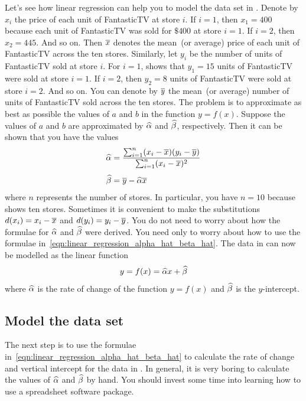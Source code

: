 \documentclass[a4paper,oneside,12pt]{article}
\begin{document}
Let's see how linear regression can help you to model the data set in
.  Denote by $x_i$ the price of each unit of
FantasticTV at store $i$.  If $i = 1$, then $x_1 = 400$ because each
unit of FantasticTV was sold for $\$400$ at store $i = 1$.  If
$i = 2$, then $x_2 = 445$.  And so on.  Then $\overline{x}$ denotes the
mean~(or average) price of each unit of FantasticTV across the ten
stores.  Similarly, let $y_i$ be the number of units of FantasticTV
sold at store $i$.  For $i = 1$,  shows that $y_1 =
15$ units of FantasticTV were sold at store $i = 1$.  If $i = 2$, then
$y_2 = 8$ units of FantasticTV were sold at store $i = 2$.  And so
on.  You can denote by $\overline{y}$ the mean~(or average) number of units
of FantasticTV sold across the ten stores.  The problem is to
approximate as best as possible the values of $a$ and $b$ in the
function $y = f(x)$.  Suppose the values of $a$ and $b$ are
approximated by $\widehat{\alpha}$ and $\widehat{\beta}$, respectively.  Then it can
be shown that you have the values
\begin{equation}
\label{eqn:linear_regression_alpha_hat_beta_hat}
\begin{aligned}
\widehat{\alpha}
&=
\frac{
  \sum_{i=1}^n (x_i - \overline{x}) (y_i - \overline{y})
}{
  \sum_{i=1}^n (x_i - \overline{x})^2
} \\[4pt]
\widehat{\beta}
&=
\overline{y} - \widehat{\alpha} \overline{x}
\end{aligned}
\end{equation}
where $n$ represents the number of stores.  In particular, you have
$n = 10$ because  shows ten stores.  Sometimes it
is convenient to make the substitutions $d(x_i) = x_i - \overline{x}$ and
$d(y_i) = y_i - \overline{y}$.  You do not need to worry about how the
formulae for $\widehat{\alpha}$ and $\widehat{\beta}$ were derived. You need only to
worry about how to use the formulae
in~\eqref{eqn:linear_regression_alpha_hat_beta_hat}.  The data in
 can now be modelled as the linear function
\[
y
=
f(x)
=
\widehat{\alpha} x + \widehat{\beta}
\]
where $\widehat{\alpha}$ is the rate of change of the function $y = f(x)$ and
$\widehat{\beta}$ is the $y$-intercept.



\subsection*{Model the data set}

The next step is to use the formulae
in~\eqref{eqn:linear_regression_alpha_hat_beta_hat} to calculate the
rate of change and vertical intercept for the data in
.  In general, it is very boring to calculate the
values of $\widehat{\alpha}$ and $\widehat{\beta}$ by hand.  You should invest some
time into learning how to use a spreadsheet software package.
\end{document}
